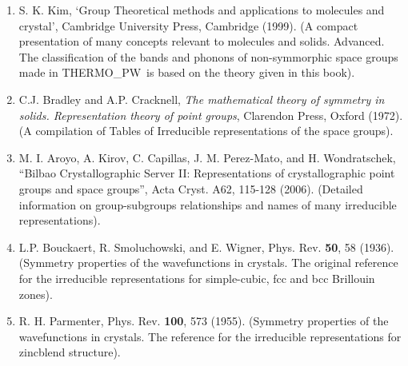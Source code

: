 \documentclass[12pt,a4paper]{article}
\def\tpw{{\sc THERMO\_PW}}
\begin{document}
\begin{enumerate}
\item
S. K. Kim, `Group Theoretical methods and applications to molecules and 
crystal',
Cambridge University Press, Cambridge (1999). 
(A compact presentation of many concepts relevant to molecules and solids.
Advanced. The classification of the bands and phonons of non-symmorphic space groups
made in \tpw\ is based on the theory given in this book).

\item
C.J. Bradley and A.P. Cracknell, {\it The mathematical
theory of symmetry in solids. Representation theory of point groups},
Clarendon Press, Oxford (1972). (A compilation of Tables of Irreducible 
representations of the space groups).

\item
M. I. Aroyo, A. Kirov, C. Capillas, J. M. Perez-Mato, and H. Wondratschek,
``Bilbao Crystallographic Server II: Representations of crystallographic 
point groups and space groups'', Acta Cryst. A62, 115-128 (2006).
(Detailed information on group-subgroups relationships and names
of many irreducible representations).

\item
L.P. Bouckaert, R. Smoluchowski, and E. Wigner, Phys. Rev. {\bf 50}, 58 (1936).
(Symmetry properties of the wavefunctions in crystals. The original reference
for the irreducible representations for simple-cubic, fcc and bcc
Brillouin zones).

\item
R. H. Parmenter, Phys. Rev. {\bf 100}, 573 (1955).
(Symmetry properties of the wavefunctions in crystals. The reference
for the irreducible representations for zincblend structure).

\end{enumerate}
\end{document}
